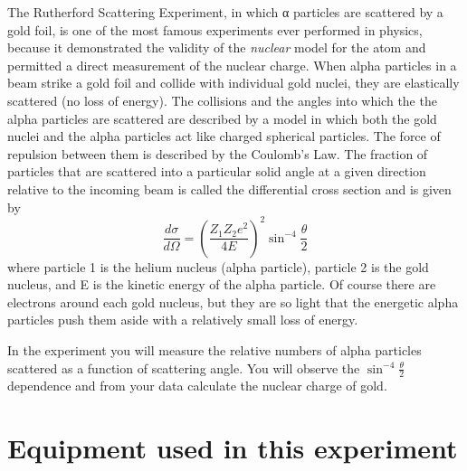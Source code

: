 \documentclass{../lab}
\begin{document}
The Rutherford Scattering Experiment, in which α particles are scattered by a gold foil, is one of the most famous experiments ever performed in physics, because it demonstrated the validity of the \emph{nuclear} model for the atom and permitted a direct measurement of the nuclear charge. When alpha particles in a beam strike a gold foil and collide with individual gold nuclei, they are elastically scattered (no loss of energy). The collisions and the angles into which the the alpha particles are scattered are described by a model in which both the gold nuclei and the alpha particles act like charged spherical particles. The force of repulsion between them is described by the Coulomb's Law. The fraction of particles that are scattered into a particular solid angle at a given direction relative to the incoming beam is called the differential cross section and is given by
\[
\frac{d\sigma}{d\Omega} = \left( \frac{Z_1 Z_2 e^2}{4E} \right)^2 \sin^{-4} \frac{\theta}{2}
\]
where particle 1 is the helium nucleus (alpha particle), particle 2 is the gold nucleus, and E is the kinetic energy of the alpha particle. Of course there are electrons around each gold nucleus, but they are so light that the energetic alpha particles push them aside with a relatively small loss of energy.

In the experiment you will measure the relative numbers of alpha particles scattered as a function of scattering angle. You will observe the $\sin^{-4} \frac{\theta}{2}$ dependence and from your data calculate the nuclear charge of gold.

\section{Equipment used in this experiment}
\end{document}
